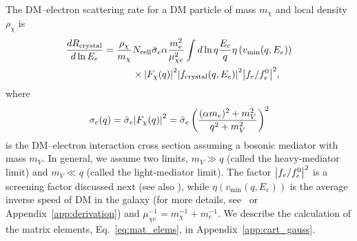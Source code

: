 \documentclass[
    prd, twocolumn, superscriptaddress, nofootinbib, amsmath, amssymb,
    aps, floatfix,preprintnumbers
]{revtex4-2}
\begin{document}
        The DM--electron scattering rate for a DM particle of mass $m_\chi$ and local density $\rho_\chi$ is
        \begin{equation}\label{eq:finRate}
            \begin{split}
                \frac{d R_\mathrm{crystal}}{d \ln{E_e}} = \frac{\rho_\chi}{m_\chi}& N_\mathrm{cell}\Bar{\sigma}_e\alpha\frac{m_e^2}{\mu_{\chi e}^2}\int d\ln{q} \frac{E_e}{q} \eta\left(v_\mathrm{min}(q, E_e)\right)\\&\times\abs{F_\chi (q)}^2\abs{f_\mathrm{crystal}(q, E_e)}^2 \abs{f_e/f_e^0}^2,
            \end{split}
        \end{equation}
        where
        \begin{equation*}
            \sigma_e (q)= \Bar{\sigma}_e \abs{F_\chi(q)}^2 = \Bar{\sigma}_e \left(\frac{(\alpha m_e)^2 + m_V^2}{q^2 + m_V^2}\right)^2
        \end{equation*}
        is the DM--electron interaction cross section assuming a bosonic mediator with mass $m_V$. In general, we assume two limits, $m_V\gg q$ (called the heavy-mediator limit) and $m_V\ll q$ (called the light-mediator limit). The factor $\abs{f_e/f_e^0}^2$ is a screening factor discussed next (see also \cite{Griffin21}), while $\eta(v_\mathrm{min}(q, E_e))$ is the average inverse speed of DM in the galaxy (for more details, see~\cite{Essig:2015cda} or Appendix~\ref{app:derivation}) and $\mu_{\chi e}^{-1} = m_\chi^{-1} + m_e^{-1}$. We describe the calculation of the matrix elements, Eq.~\eqref{eq:mat_elems}, in Appendix~\ref{app:cart_gauss}. 
\end{document}
